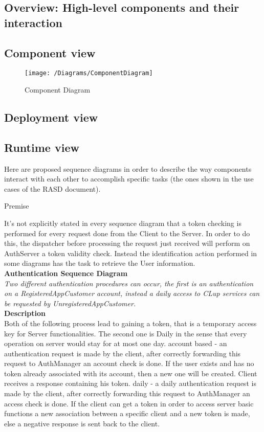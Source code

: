 \subsection{Overview: High-level components and their interaction}

\subsection{Component view}
\begin{figure}[H]
	\centering
	\texttt{[image: /Diagrams/ComponentDiagram]}
	\caption{Component Diagram}
\end{figure}
\subsection{Deployment view}

\subsection{Runtime view}
Here are proposed sequence diagrams in order to describe the way components interact with each other to accomplish specific tasks (the ones shown in the use cases of the RASD document).\\

\begin{center} 
Premise\\
\end{center}
It’s not explicitly stated in every sequence diagram that a token checking is performed for every request done from the Client to the Server. In order to do this, the dispatcher before processing the request just received will perform on AuthServer a token validity check. Instead the identification action performed in some diagrams has the task to retrieve the User information.\\

\newpage
\textbf{Authentication Sequence Diagram\\}
\textit{Two different authentication procedures can occur, the first is an authentication on a RegisteredAppCustomer account, instead a daily access to CLup services can be requested by UnregisteredAppCustomer.\\}
\textbf{Description\\}
Both of the following process lead to gaining a token, that is a temporary access key for Server functionalities. The second one is Daily in the sense that every operation on server would stay for at most one day.
account based - an authentication request is made by the client, after correctly forwarding this request to AuthManager an account check is done. If the user exists and has no token already associated with its account, then a new one will be created. Client receives a response containing his token. 
daily - a daily authentication request is made by the client, after correctly forwarding this request to AuthManager an access check is done. If the client can get a token in order to access server basic functions a new association between a specific client and a new token is made, else a negative response is sent back to the client. \\

